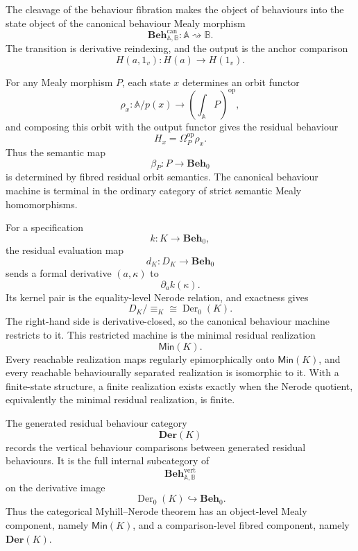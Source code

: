 The cleavage of the behaviour fibration makes the object of behaviours into
the state object of the canonical behaviour Mealy morphism
\[
    \mathbf{Beh}^{\mathrm{can}}_{\mathbb A,\mathbb B}:
    \mathbb A\rightsquigarrow\mathbb B.
\]
The transition is derivative reindexing, and the output is the anchor
comparison
\[
    H(a,1_v):H(a)\to H(1_v).
\]

For any Mealy morphism \(P\), each state \(x\) determines an orbit functor
\[
    \rho_x:\mathbb A/p(x)\to
    \left(\int_{\mathbb A}P\right)^{\mathrm{op}},
\]
and composing this orbit with the output functor gives the residual behaviour
\[
    H_x=\Omega_P^{\mathrm{op}}\rho_x.
\]
Thus the semantic map
\[
    \beta_P:P\to\mathbf{Beh}_0
\]
is determined by fibred residual orbit semantics. The canonical behaviour
machine is terminal in the ordinary category of strict semantic Mealy
homomorphisms.

For a specification
\[
    k:K\to\mathbf{Beh}_0,
\]
the residual evaluation map
\[
    d_K:D_K\to\mathbf{Beh}_0
\]
sends a formal derivative \((a,\kappa)\) to
\[
    \partial_a k(\kappa).
\]
Its kernel pair is the equality-level Nerode relation, and exactness gives
\[
    D_K/{\equiv_K}
    \cong
    \operatorname{Der}_0(K).
\]
The right-hand side is derivative-closed, so the canonical behaviour machine
restricts to it. This restricted machine is the minimal residual realization
\[
    \mathsf{Min}(K).
\]
Every reachable realization maps regularly epimorphically onto
\(\mathsf{Min}(K)\), and every reachable behaviourally separated realization
is isomorphic to it. With a finite-state structure, a finite realization exists
exactly when the Nerode quotient, equivalently the minimal residual
realization, is finite.

The generated residual behaviour category
\[
    \mathbf{Der}(K)
\]
records the vertical behaviour comparisons between generated residual
behaviours. It is the full internal subcategory of
\[
    \mathbf{Beh}^{\mathrm{vert}}_{\mathbb A,\mathbb B}
\]
on the derivative image
\[
    \operatorname{Der}_0(K)\hookrightarrow\mathbf{Beh}_0.
\]
Thus the categorical Myhill--Nerode theorem has an object-level Mealy
component, namely \(\mathsf{Min}(K)\), and a comparison-level fibred component,
namely \(\mathbf{Der}(K)\).
